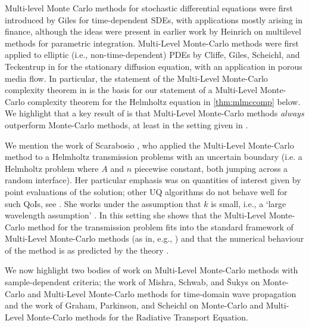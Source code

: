 Multi-level Monte Carlo methods for stochastic differential equations were first introduced by Giles \cite{Gi:08} for time-dependent SDEs, with applications mostly arising in finance, although the ideas were present in earlier work by Heinrich \cite{He:98,He:01} on multilevel methods for parametric integration. Multi-Level Monte-Carlo methods were first applied to elliptic (i.e., non-time-dependent) PDEs by Cliffe, Giles, Scheichl, and Teckentrup in \cite{ClGiScTe:11} for the stationary diffusion equation, with an application in porous media flow. In particular, the statement of the Multi-Level Monte-Carlo complexity theorem in \cite[Theorem 1]{ClGiScTe:11} is the basis for our statement of a Multi-Level Monte-Carlo complexity theorem for the Helmholtz equation in \cref{thm:mlmccomp} below. We highlight that a key result of \cite[Theorem 1]{ClGiScTe:11} is that Multi-Level Monte-Carlo methods \emph{always} outperform Monte-Carlo methods, at least in the setting given in \cite{ClGiScTe:11}.

We mention the work of Scarabosio \cite{Sc:17}, who applied the Multi-Level Monte-Carlo method to a Helmholtz transmission problems with an uncertain boundary (i.e. a Helmholtz problem where $A$ and $n$ piecewise constant, both jumping across a random interface). Her particular emphasis was on quantities of interest given by point evaluations of the solution; other UQ algorithms do not behave well for such QoIs, see \cite[Section 3.3]{Sc:17}. She works under the assumption that $k$ is small, i.e., a `large wavelength assumption' \cite[Assumption 3.1]{Sc:17}.  In this setting she shows that the Multi-Level Monte-Carlo method for the transmission problem fits into the standard framework of Multi-Level Monte-Carlo methods \cite[Proposition 4.2]{Sc:17} (as in, e.g., \cite{ClGiScTe:11,Gi:15}) and that the numerical behaviour of the method is as predicted by the theory \cite[Section 6]{Sc:17}.

We now highlight two bodies of work on Multi-Level Monte-Carlo methods with sample-dependent criteria; the work of Mishra, Schwab, and \v{S}ukys on Monte-Carlo and Multi-Level Monte-Carlo methods for time-domain wave propagation and the work of Graham, Parkinson, and Scheichl on Monte-Carlo and Multi-Level Monte-Carlo methods for the Radiative Transport Equation.

